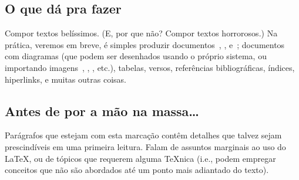 \subsection{O que dá pra fazer}

Compor textos belíssimos. (E, por que não? Compor textos horrorosos.) Na
prática, veremos em breve, é simples produzir
documentos~, , e~; documentos
com diagramas (que podem ser desenhados usando o próprio sistema, ou
importando imagens~, , ,
etc.), tabelas, versos, referências bibliográficas, índices,
hiperlinks, e muitas outras coisas.


\subsection{Antes de por a mão na massa\ldots}

\begin{detalhe}
Parágrafos que estejam com esta marcação contêm detalhes que talvez
sejam prescindíveis em uma primeira leitura. Falam de assuntos
marginais ao uso do \LaTeX, ou de tópicos que requerem alguma
\TeX nica (i.e., podem empregar conceitos que não são abordados até
um ponto mais adiantado do texto).
\end{detalhe}
